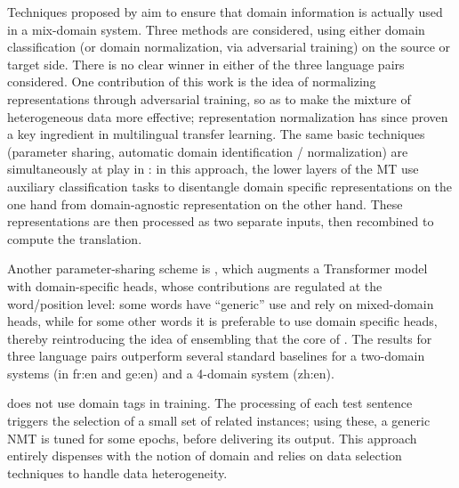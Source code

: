 \documentclass[11pt,a4paper]{article}
\newcommand{\fyTodo}[1]{\Todo[FY:]{\textcolor{orange}{#1}}}
\begin{document}
Techniques proposed by \cite{Britz17mixing} aim to ensure that domain information is actually used in a mix-domain system. Three methods are considered, using either domain classification (or domain normalization, via adversarial training) on the source or target side. There is no clear winner in either of the three language pairs considered. One contribution of this work is the idea of normalizing representations through adversarial training, so as to make the mixture of heterogeneous data more effective; representation normalization has since proven a key ingredient in multilingual transfer learning.
The same basic techniques (parameter sharing, automatic domain identification / normalization) are simultaneously at play in \cite{Zeng18multidomain,Su19exploring}: in this approach, the lower layers of the MT use auxiliary classification tasks to disentangle domain specific representations on the one hand from domain-agnostic representation on the other hand. These representations are then processed as two separate inputs, then recombined to compute the translation.

Another parameter-sharing scheme is \cite{Jiang19multidomain}, which augments a Transformer model with domain-specific heads, whose contributions are regulated at the word/position level: some words have ``generic'' use and rely on mixed-domain heads, while for some other words it is preferable to use domain specific heads, thereby reintroducing the idea of ensembling that the core of \cite{Huck15mixeddomain,Saunders19ucam}. The results for three language pairs outperform several standard baselines for a two-domain systems (in fr:en and ge:en) and a 4-domain system (zh:en).%

 does not use domain tags in training. The processing of each test sentence triggers the selection of a small set of related instances; using these, a generic NMT is tuned for some epochs, before delivering its output. This approach entirely dispenses with the notion of domain and relies on data selection techniques to handle data heterogeneity. 
\end{document}
